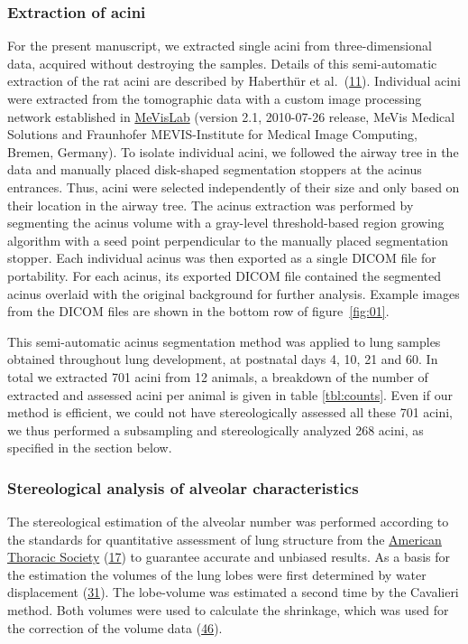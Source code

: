 \documentclass[
  american,
]{article}
\begin{document}
\hypertarget{extraction-of-acini}{%
\subsubsection{Extraction of acini}\label{extraction-of-acini}}

For the present manuscript, we extracted single acini from three-dimensional data, acquired without destroying the samples.
Details of this semi-automatic extraction of the rat acini are described by Haberthür et al.~(\protect\hyperlink{ref-7YLeeyu}{11}).
Individual acini were extracted from the tomographic data with a custom image processing network established in \href{https://www.mevislab.de/}{MeVisLab} (version 2.1, 2010-07-26 release, MeVis Medical Solutions and Fraunhofer MEVIS-Institute for Medical Image Computing, Bremen, Germany).
To isolate individual acini, we followed the airway tree in the data and manually placed disk-shaped segmentation stoppers at the acinus entrances.
Thus, acini were selected independently of their size and only based on their location in the airway tree.
The acinus extraction was performed by segmenting the acinus volume with a gray-level threshold-based region growing algorithm with a seed point perpendicular to the manually placed segmentation stopper.
Each individual acinus was then exported as a single DICOM file for portability.
For each acinus, its exported DICOM file contained the segmented acinus overlaid with the original background for further analysis.
Example images from the DICOM files are shown in the bottom row of figure~\ref{fig:01}.

This semi-automatic acinus segmentation method was applied to lung samples obtained throughout lung development, at postnatal days 4, 10, 21 and 60.
In total we extracted 701 acini from 12 animals, a breakdown of the number of extracted and assessed acini per animal is given in table \ref{tbl:counts}.
Even if our method is efficient, we could not have stereologically assessed all these 701 acini, we thus performed a subsampling and stereologically analyzed 268 acini, as specified in the section below.

\hypertarget{stereological-analysis-of-alveolar-characteristics}{%
\subsubsection{Stereological analysis of alveolar characteristics}\label{stereological-analysis-of-alveolar-characteristics}}

The stereological estimation of the alveolar number was performed according to the standards for quantitative assessment of lung structure from the \href{http://www.thoracic.org/}{American Thoracic Society} (\protect\hyperlink{ref-dNc8FfNn}{17}) to guarantee accurate and unbiased results.
As a basis for the estimation the volumes of the lung lobes were first determined by water displacement (\protect\hyperlink{ref-KGbSQovR}{31}).
The lobe-volume was estimated a second time by the Cavalieri method.
Both volumes were used to calculate the shrinkage, which was used for the correction of the volume data (\protect\hyperlink{ref-wnl86DEM}{46}).
\end{document}
